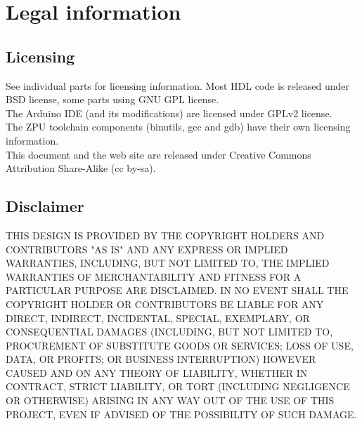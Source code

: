 \chapter{Legal information}

\section{Licensing}
See individual parts for licensing information. Most HDL code is released under BSD license, some parts using GNU GPL license.\\
The Arduino IDE (and its modifications) are licensed under GPLv2 license.\\
The ZPU toolchain components (binutils, gcc and gdb) have their own licensing information.\\
This document and the web site are released under Creative Commons Attribution Share-Alike (cc by-sa). \\

\section{Disclaimer}
THIS DESIGN IS PROVIDED BY THE COPYRIGHT HOLDERS AND CONTRIBUTORS "AS IS" AND ANY EXPRESS OR IMPLIED WARRANTIES, INCLUDING, 
BUT NOT LIMITED TO, THE IMPLIED WARRANTIES OF MERCHANTABILITY AND FITNESS FOR A PARTICULAR PURPOSE ARE DISCLAIMED. 
IN NO EVENT SHALL THE COPYRIGHT HOLDER OR CONTRIBUTORS BE LIABLE FOR ANY DIRECT, INDIRECT, INCIDENTAL, SPECIAL, EXEMPLARY, 
OR CONSEQUENTIAL DAMAGES (INCLUDING, BUT NOT LIMITED TO, PROCUREMENT OF SUBSTITUTE GOODS OR SERVICES; LOSS OF USE, DATA, 
OR PROFITS; OR BUSINESS INTERRUPTION) HOWEVER CAUSED AND ON ANY THEORY OF LIABILITY, WHETHER IN CONTRACT, STRICT LIABILITY, 
OR TORT (INCLUDING NEGLIGENCE OR OTHERWISE) ARISING IN ANY WAY OUT OF THE USE OF THIS PROJECT, EVEN IF ADVISED OF THE 
POSSIBILITY OF SUCH DAMAGE.
